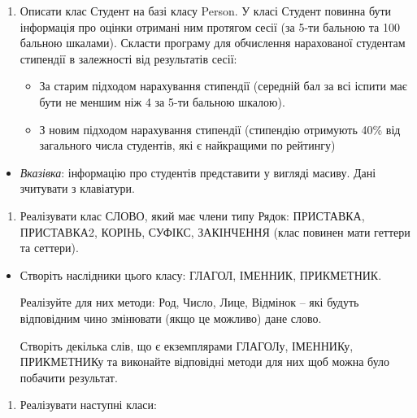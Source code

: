 \documentclass[]{article}
\begin{document}
\begin{enumerate}
\def\labelenumi{\arabic{enumi}.}
\item
  Описати клас Студент на базі класу Person. У класі Студент повинна
  бути інформація про оцінки отримані ним протягом сесії (за 5-ти
  бальною та 100 бальною шкалами). Скласти програму для обчислення
  нарахованої студентам стипендії в залежності від результатів сесії:

  \begin{itemize}
  \item
    За старим підходом нарахування стипендії (середній бал за всі іспити
    має бути не меншим ніж 4 за 5-ти бальною шкалою).
  \item
    З новим підходом нарахування стипендії (стипендію отримують 40\% від
    загального числа студентів, які є найкращими по рейтингу)
  \end{itemize}
\end{enumerate}

\begin{itemize}
\item
  \emph{Вказівка}: інформацію про студентів представити у вигляді
  масиву. Дані зчитувати з клавіатури.
\end{itemize}

\begin{enumerate}
\def\labelenumi{\arabic{enumi}.}
\item
  Реалізувати клас СЛОВО, який має члени типу Рядок: ПРИСТАВКА,
  ПРИСТАВКА2, КОРІНЬ, СУФІКС, ЗАКІНЧЕННЯ (клас повинен мати геттери та
  сеттери).
\end{enumerate}

\begin{itemize}
\item
  Створіть наслідники цього класу: ГЛАГОЛ, ІМЕННИК, ПРИКМЕТНИК.

  Реалізуйте для них методи: Род, Число, Лице, Відмінок -- які будуть
  відповідним чино змінювати (якщо це можливо) дане слово.

  Створіть декілька слів, що є екземплярами ГЛАГОЛу, ІМЕННИКу,
  ПРИКМЕТНИКу та виконайте відповідні методи для них щоб можна було
  побачити результат.
\end{itemize}

\begin{enumerate}
\def\labelenumi{\arabic{enumi}.}
\item
  Реалізувати наступні класи:
\end{enumerate}
\end{document}
